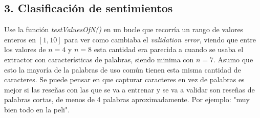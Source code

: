 \documentclass[14pt,a4paper]{report}
\begin{document}
\subsection*{3. Clasificación de sentimientos}
Use la función \textit{testValuesOfN()} en un bucle que recorría un rango de valores enteros en $[1,10]$ para ver como cambiaba el \textit{validation error}, viendo que entre los valores de $n=4$ y $n=8$ esta cantidad era parecida a cuando se usaba el extractor con características de palabras, siendo minima con $n=7$. Asumo que esto la mayoría de la palabras de uso común tienen esta misma cantidad de caracteres. Se puede pensar en que capturar caracteres en vez de palabras es mejor si las reseñas con las que se va a entrenar y se va a validar son reseñas de palabras cortas, de menos de 4 palabras aproximadamente. Por ejemplo: "muy bien todo en la peli".
\end{document}
